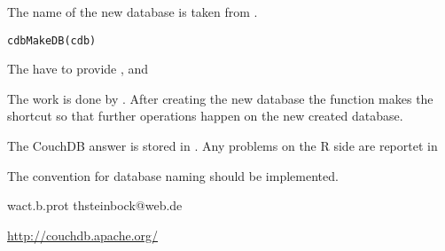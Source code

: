 \begin{Description}\relax
The name of the new database is taken from .
\end{Description}
\begin{Usage}
\begin{verbatim}
cdbMakeDB(cdb)
\end{verbatim}
\end{Usage}
\begin{Arguments}
\begin{ldescription}
\item[\code{cdb}] The  have to provide ,
 and  

\end{ldescription}
\end{Arguments}
\begin{Details}\relax
The work is done by . After creating the new database
the function makes the shortcut  so that further
operations happen on the new created database.
\end{Details}
\begin{Value}
\begin{ldescription}
\item[\code{cdb}] The CouchDB answer is stored in . Any
problems on the R side are reportet in 

\end{ldescription}
\end{Value}
\begin{Note}\relax
The convention for database naming should be implemented.
\end{Note}
\begin{Author}\relax
wact.b.prot
thsteinbock@web.de
\end{Author}
\begin{References}\relax
\url{  http://couchdb.apache.org/       }
\end{References}
\begin{SeeAlso}\relax
{}
\end{SeeAlso}

